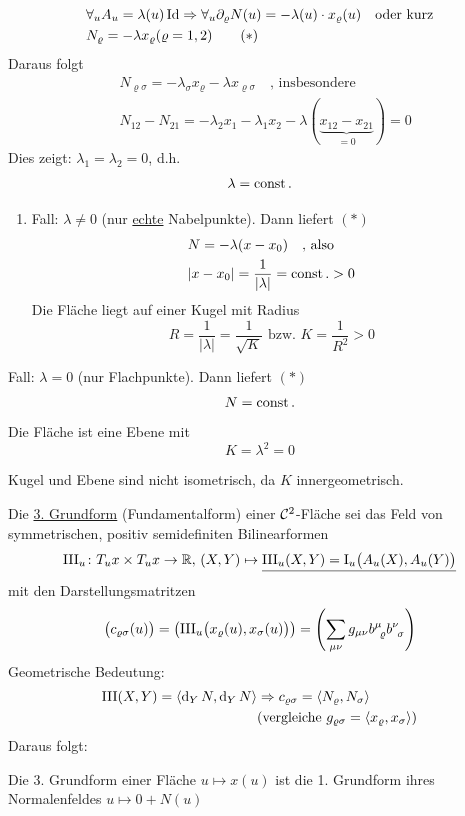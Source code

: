 \begin{beweis}
 \begin{align*}
  &\forall_u A_u = \lambda (u) \operatorname{Id} \Rightarrow \forall_u \partial_\varrho N(u) = - \lambda(u) \cdot x_\varrho (u) \quad \text{oder kurz} \\
  &N_\varrho = - \lambda x_\varrho (\varrho = 1,2) \tag{\(\ast\)}
 \end{align*}
 Daraus folgt
 \begin{align*}
  &N_{\varrho \sigma} = - \lambda_\sigma x_\varrho - \lambda x_{\varrho \sigma} \quad\text{, insbesondere} \\
  &N_{12} - N_{21} = -\lambda_2 x_1 - \lambda_1 x_2 - \lambda (\underbrace{x_{12} - x_{21}}_{= 0}) = 0
 \end{align*}
 Dies zeigt: \(\lambda_1 = \lambda_2 = 0\), d.h.
 \[
  \lambda = \operatorname{const}.
 \]
 \begin{enumerate}
  \item Fall: \(\lambda \ne 0\) (nur \uline{echte} Nabelpunkte). Dann liefert \((\ast)\)
  \begin{align*}
   &N = -\lambda (x - x_0) \quad \text{, also} \\
   & |x-x_0| = \frac{1}{|\lambda|} = \operatorname{const}. > 0
  \end{align*}
  Die Fläche liegt auf einer Kugel mit Radius 
  \[
   R = \frac{1}{|\lambda|} = \frac{1}{\sqrt{K}} \text{ bzw. } K = \frac{1}{R^2} > 0
  \]
 \end{enumerate}
 \item Fall: \(\lambda = 0\) (nur Flachpunkte). Dann liefert \((\ast)\)
 \begin{align*}
  N = \operatorname{const}.
 \end{align*}
 Die Fläche ist eine Ebene mit
 \[
  K = \lambda^2 = 0
 \]
\end{beweis}

\begin{folgerung}
 Kugel und Ebene sind nicht isometrisch, da \(K\) innergeometrisch.
\end{folgerung}

\begin{definition}
 Die \uline{3. Grundform} (Fundamentalform) einer \(\mathcal{C}^2\)-Fläche sei das Feld von symmetrischen, positiv semidefiniten Bilinearformen
 \[
  \Rom3_u \colon T_u x \times T_u x \to \IR, \, (X,Y) \mapsto \uline{\Rom3_u(X,Y) = \Rom1_u \big(A_u(X), A_u(Y)\big)}
 \]
 mit den Darstellungsmatritzen
 \[
  \big(c_{\varrho \sigma} (u)\big) = \left(\Rom3_u \big( x_\varrho (u), x_\sigma(u)\big)\right) = \left(\sum_{\mu\nu} g_{\mu \nu} \wein{\mu}{\varrho} \wein \nu \sigma \right)
 \]
 Geometrische Bedeutung:
 \begin{align*}
  \Rom3(X,Y) = \langle \dd_Y N, \dd_Y N \rangle &\Rightarrow c_{\varrho \sigma} = \langle N_\varrho, N_\sigma \rangle \\
  &(\text{vergleiche } g_{\varrho \sigma} = \langle x_\varrho, x_\sigma \rangle)
 \end{align*}
 Daraus folgt: \par
 Die 3. Grundform einer Fläche \(u \mapsto x(u)\) ist die 1. Grundform ihres Normalenfeldes \(u \mapsto 0 + N(u)\)
\end{definition}

